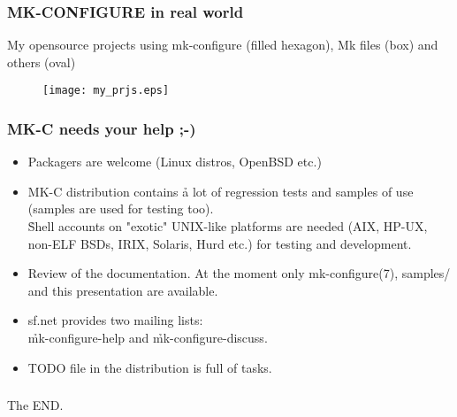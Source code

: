 \documentclass[hyperref={colorlinks=true}]{beamer}
\begin{document}


\begin{frame}[fragile,t]
  \frametitle{MK-CONFIGURE in real world}
  \begin{block}{My opensource projects using
      mk-configure (filled hexagon), Mk files (box) and others (oval)}
    \begin{figure}
      \texttt{[image: my\_prjs.eps]}
    \end{figure}
  \end{block}
\end{frame}



\begin{frame}[fragile,t]
  \frametitle{MK-C needs your help ;-)}
  \begin{block}{}
  \begin{itemize}
  \item Packagers are welcome (Linux distros, OpenBSD etc.)
  \item MK-C distribution contains \h{a lot of regression tests and
    samples of use} (samples are used for testing too).\\
    \h{Shell accounts} on
    "exotic" UNIX-like platforms are needed (AIX, HP-UX, non-ELF BSDs,
    IRIX, Solaris, Hurd etc.) for testing and development.
  \item Review of the documentation. At the moment only mk-configure(7),
    samples/ and this presentation are available.
  \item sf.net provides two mailing lists:\\
    \h{mk-configure-help} and \h{mk-configure-discuss}.
  \item TODO file in the distribution is full of tasks.
  \end{itemize}
  \end{block}
\end{frame}


\begin{frame}[fragile]
  \frametitle{}
  \begin{block}{}
    \begin{center}
      \Huge{The END.}
    \end{center}
  \end{block}
\end{frame}


\end{document}
